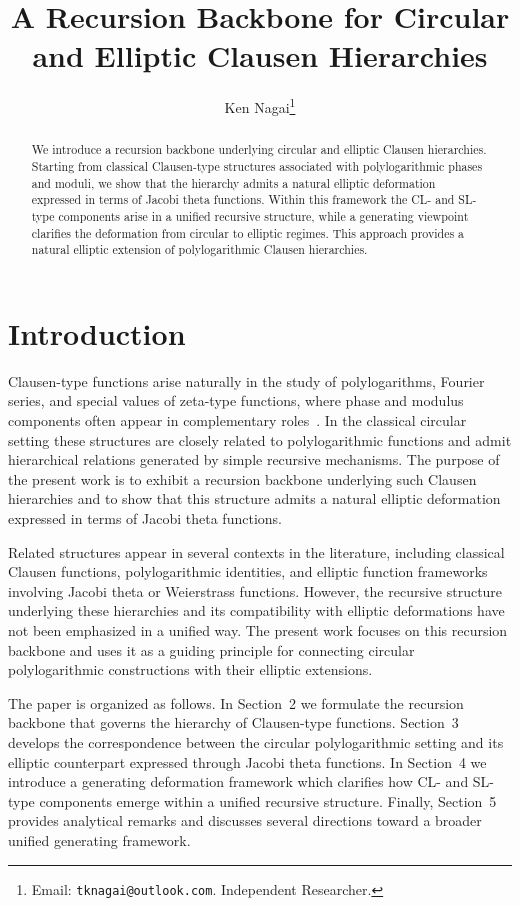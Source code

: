 \documentclass[11pt]{article}
\title{A Recursion Backbone for Circular and Elliptic Clausen Hierarchies}
\author{Ken Nagai\thanks{Email: \texttt{tknagai@outlook.com}. Independent Researcher.}}
\date{}
\begin{document}
\maketitle

\begin{abstract}
We introduce a recursion backbone underlying circular and
elliptic Clausen hierarchies.
Starting from classical Clausen-type structures associated
with polylogarithmic phases and moduli, we show that the
hierarchy admits a natural elliptic deformation expressed
in terms of Jacobi theta functions.
Within this framework the CL- and SL-type components arise
in a unified recursive structure, while a generating
viewpoint clarifies the deformation from circular to
elliptic regimes.
This approach provides a natural elliptic extension of
polylogarithmic Clausen hierarchies.
\end{abstract}



\section{Introduction}

Clausen-type functions arise naturally in the study of
polylogarithms, Fourier series, and special values of
zeta-type functions, where phase and modulus components
often appear in complementary roles~\cite{Lewin1981}.
In the classical circular setting these structures are
closely related to polylogarithmic functions and admit
hierarchical relations generated by simple recursive
mechanisms.
The purpose of the present work is to exhibit a recursion
backbone underlying such Clausen hierarchies and to show
that this structure admits a natural elliptic deformation
expressed in terms of Jacobi theta functions.

Related structures appear in several contexts in the
literature, including classical Clausen functions,
polylogarithmic identities, and elliptic function
frameworks involving Jacobi theta or Weierstrass
functions.
However, the recursive structure underlying these
hierarchies and its compatibility with elliptic
deformations have not been emphasized in a unified way.
The present work focuses on this recursion backbone and
uses it as a guiding principle for connecting circular
polylogarithmic constructions with their elliptic
extensions.

The paper is organized as follows.
In Section~2 we formulate the recursion backbone that
governs the hierarchy of Clausen-type functions.
Section~3 develops the correspondence between the
circular polylogarithmic setting and its elliptic
counterpart expressed through Jacobi theta functions.
In Section~4 we introduce a generating deformation
framework which clarifies how CL- and SL-type components
emerge within a unified recursive structure.
Finally, Section~5 provides analytical remarks and
discusses several directions toward a broader unified
generating framework.
\end{document}
